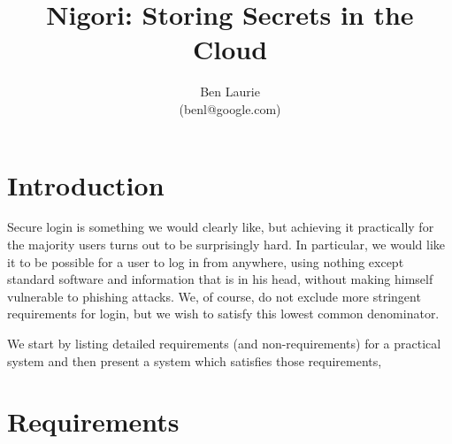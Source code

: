 \documentclass[a4paper,titlepage]{article}
\title{Nigori: Storing Secrets in the Cloud}
\author{Ben Laurie\\
(benl@google.com)}
\begin{document}
\maketitle

\def\qe#1{\begin{equation}#1\end{equation}}

\section{Introduction}

Secure login is something we would clearly like, but achieving it
practically for the majority users turns out to be surprisingly
hard. In particular, we would like it to be possible for a user to log
in from anywhere, using nothing except standard software and
information that is in his head, without making himself vulnerable to
phishing attacks. We, of course, do not exclude more stringent
requirements for login, but we wish to satisfy this lowest common
denominator.

We start by listing detailed requirements (and non-requirements) for a
practical system and then present a system which satisfies those
requirements,

\section{Requirements}
\end{document}
